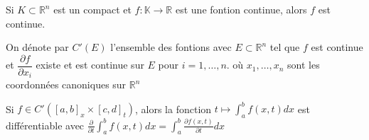 \documentclass[12pt,a4paper]{article}
\begin{document}
\begin{flushleft}
\begin{thm}
Si $K \subset \mathbb{R}^n$ est un compact et $f : \mathbb{K} \longrightarrow \mathbb{R}$ est une fontion continue, alors $f$ est continue.
\end{thm}

\begin{mydef}
On dénote par $C'(E)$ l'ensemble des fontions \fER avec $E \subset \mathbb{R}^n$ tel que $f$ est continue et $\dfrac{\partial f}{\partial x_i}$ existe et est continue sur $E$ pour $i= 1, \ldots , n$. où $x_1, \ldots , x_n$ sont les coordonnées canoniques sur $\mathbb{R}^n$
\end{mydef}

\begin{thm}
Si $f \in C'([a,b]_x \times [c,d]_t)$, alors la fonction $t \mapsto \int_a^b f(x,t) dx$ est différentiable avec $\frac{\partial}{\partial t} \int_a^b f(x,t) dx = \int_a^b \frac{\partial f (x,t)}{\partial t} dx$
 \end{thm}


\end{flushleft}
\end{document}
